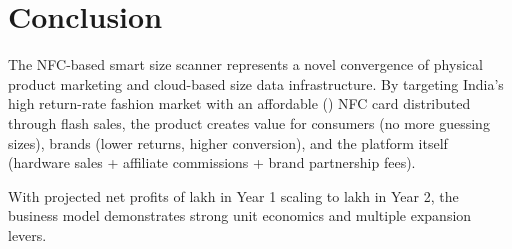 \documentclass[12pt,a4paper]{article}
\begin{document}
\section{Conclusion}

The NFC-based smart size scanner represents a novel convergence of physical product marketing and cloud-based size data infrastructure. By targeting India's high return-rate fashion market with an affordable () NFC card distributed through flash sales, the product creates value for consumers (no more guessing sizes), brands (lower returns, higher conversion), and the platform itself (hardware sales + affiliate commissions + brand partnership fees).

With projected net profits of  lakh in Year 1 scaling to  lakh in Year 2, the business model demonstrates strong unit economics and multiple expansion levers.
\end{document}
